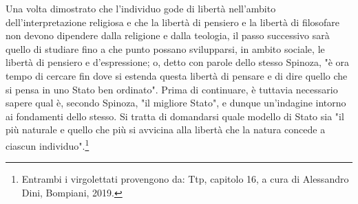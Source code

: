 Una volta dimostrato che l’individuo gode di libertà nell’ambito dell’interpretazione religiosa e che la libertà di pensiero e la libertà
di filosofare non devono dipendere dalla religione e dalla teologia, il passo successivo sarà quello di studiare fino a che punto possano svilupparsi, in ambito
sociale, le libertà di pensiero e d’espressione; o, detto con parole dello stesso
Spinoza, "è ora tempo di cercare fin dove si estenda questa libertà di pensare
e di dire quello che si pensa in uno Stato ben ordinato". Prima di continuare, è tuttavia necessario sapere qual è, secondo Spinoza, "il migliore Stato", e
dunque un’indagine intorno ai fondamenti dello stesso. Si tratta di domandarsi
quale modello di Stato sia "il più naturale e quello che più si avvicina alla libertà che la natura concede a ciascun individuo".\footnote{Entrambi i virgolettati provengono da: Ttp, capitolo 16, a cura di Alessandro Dini, Bompiani, 2019.}












\newpage